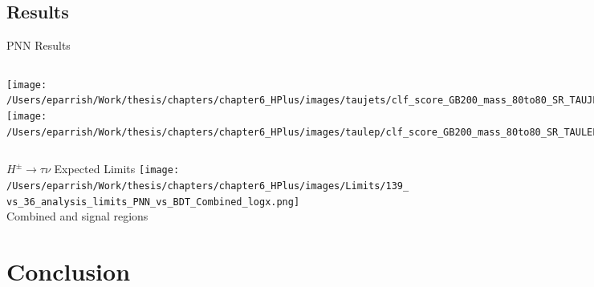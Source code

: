 \documentclass[aspectratio=169,xcolor=table]{beamer}
\begin{document}
  \subsection{Results }

    \begin{frame}[t]{PNN Results}
      \begin{columns}[t]
        \texttt{[image: /Users/eparrish/Work/thesis/chapters/chapter6\_HPlus/images/taujets/clf\_score\_GB200\_mass\_80to80\_SR\_TAUJET.png]}
        \texttt{[image: /Users/eparrish/Work/thesis/chapters/chapter6\_HPlus/images/taulep/clf\_score\_GB200\_mass\_80to80\_SR\_TAULEP.png]}

        \texttt{[image: /Users/eparrish/Work/thesis/chapters/chapter6\_HPlus/images/taujets/clf\_score\_GB200\_mass\_170to170\_SR\_TAUJET.png]}
        \texttt{[image: /Users/eparrish/Work/thesis/chapters/chapter6\_HPlus/images/taulep/clf\_score\_GB200\_mass\_170to170\_SR\_TAULEP.png]}

        \texttt{[image: /Users/eparrish/Work/thesis/chapters/chapter6\_HPlus/images/taujets/clf\_score\_GB200\_mass\_1000to1000\_SR\_TAUJET.png]}
        \texttt{[image: /Users/eparrish/Work/thesis/chapters/chapter6\_HPlus/images/taulep/clf\_score\_GB200\_mass\_1000to1000\_SR\_TAULEP.png]}
      \end{columns}
    \end{frame}

    \begin{frame}{$H^{\pm} \rightarrow \tau\nu$ Expected Limits}
      \centering
      \texttt{[image: /Users/eparrish/Work/thesis/chapters/chapter6\_HPlus/images/Limits/139\_vs\_36\_analysis\_limits\_PNN\_vs\_BDT\_Combined\_logx.png]} \\
      \centering
      Combined \taujets and \taulep signal regions
    \end{frame}

\section{Conclusion }
\end{document}
